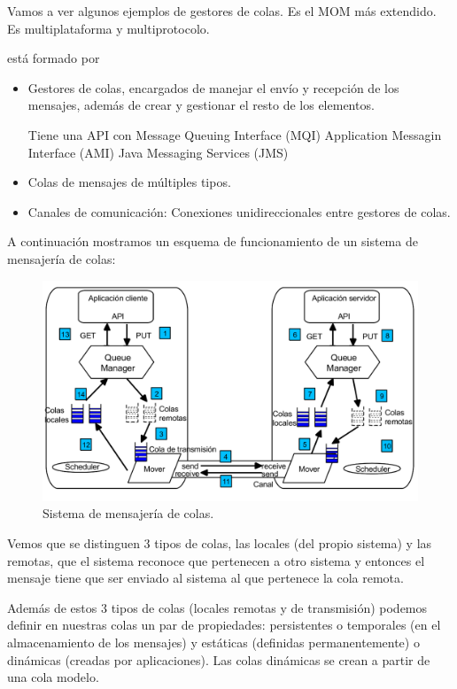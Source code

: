 \documentclass{apuntes}[nochap]
\begin{document}
Vamos a ver algunos ejemplos de gestores de colas.
Es el MOM más extendido. Es multiplataforma y multiprotocolo.


 está formado por
\begin{itemize}
	\item Gestores de colas, encargados de manejar el envío y recepción de los mensajes, además de crear y gestionar el resto de los elementos.

	Tiene una API con
	\subitem Message Queuing Interface (MQI)
	\subitem Application Messagin Interface (AMI)
	\subitem Java Messaging Services (JMS)
	\item Colas de mensajes de múltiples tipos.
	\item Canales de comunicación: Conexiones unidireccionales entre gestores de colas.
\end{itemize}

A continuación mostramos un esquema de funcionamiento de un sistema de mensajería de colas:


\begin{figure}[hbtp]
\centering
\includegraphics[width=1\textwidth]{img/MOMGen.png}
\caption{Sistema de mensajería de colas.}
\label{MOMGen}
\end{figure}
\newpage

Vemos que se distinguen 3 tipos de colas, las locales (del propio sistema) y las remotas, que el sistema reconoce que pertenecen a otro sistema y entonces el mensaje tiene que ser enviado al sistema al que pertenece la cola remota.

Además de estos 3 tipos de colas (locales remotas y de transmisión) podemos definir en nuestras colas un par de propiedades: persistentes o temporales (en el almacenamiento de los mensajes) y estáticas (definidas permanentemente) o dinámicas (creadas por aplicaciones). Las colas dinámicas se crean a partir de una cola modelo.
\end{document}
